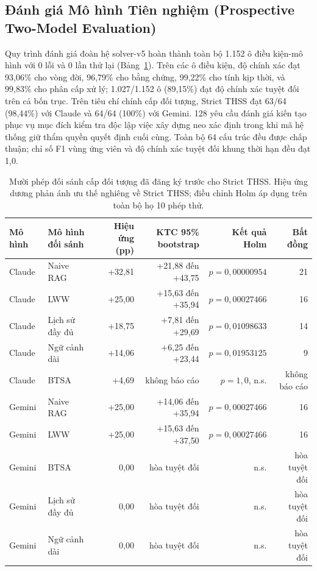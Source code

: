 \documentclass[11pt]{article}
\begin{document}
\subsection{Đánh giá Mô hình Tiên nghiệm (Prospective Two-Model Evaluation)}
Quy trình đánh giá đoàn hệ solver-v5 hoàn thành toàn bộ 1.152 ô điều kiện-mô hình với 0 lỗi và 0 lần thử lại (Bảng~\ref{tab:models_vi}). Trên các ô điều kiện, độ chính xác đạt 93{,}06\% cho vòng đời, 96{,}79\% cho bằng chứng, 99{,}22\% cho tính kịp thời, và 99{,}83\% cho phân cấp xử lý; 1.027/1.152 ô (89{,}15\%) đạt độ chính xác tuyệt đối trên cả bốn trục. Trên tiêu chí chính cấp đối tượng, Strict THSS đạt 63/64 (98{,}44\%) với Claude và 64/64 (100\%) với Gemini. 128 yêu cầu đánh giá kiến tạo phục vụ mục đích kiểm tra độc lập việc xây dựng neo xác định trong khi mã hệ thống giữ thẩm quyền quyết định cuối cùng. Toàn bộ 64 cấu trúc đều được chấp thuận; chỉ số F1 vùng ứng viên và độ chính xác tuyệt đối khung thời hạn đều đạt 1{,}0.

\begin{table}[H]
\centering
\scriptsize
\caption{Mười phép đối sánh cấp đối tượng đã đăng ký trước cho Strict THSS. Hiệu ứng dương phản ánh ưu thế nghiêng về Strict THSS; điều chỉnh Holm áp dụng trên toàn bộ họ 10 phép thử.}
\label{tab:models_vi}
\begin{tabular}{llrrrr}
\toprule
\textbf{Mô hình} & \textbf{Mô hình đối sánh} & \textbf{Hiệu ứng (pp)} & \textbf{KTC 95\% bootstrap} & \textbf{Kết quả Holm} & \textbf{Bất đồng}\\
\midrule
Claude & Naive RAG & +32{,}81 & +21{,}88 đến +43{,}75 & $p=0{,}00000954$ & 21\\
Claude & LWW & +25{,}00 & +15{,}63 đến +35{,}94 & $p=0{,}00027466$ & 16\\
Claude & Lịch sử đầy đủ & +18{,}75 & +7{,}81 đến +29{,}69 & $p=0{,}01098633$ & 14\\
Claude & Ngữ cảnh dài & +14{,}06 & +6{,}25 đến +23{,}44 & $p=0{,}01953125$ & 9\\
Claude & BTSA & +4{,}69 & không báo cáo & $p=1{,}0$, n.s. & không báo cáo\\
Gemini & Naive RAG & +25{,}00 & +14{,}06 đến +35{,}94 & $p=0{,}00027466$ & 16\\
Gemini & LWW & +25{,}00 & +15{,}63 đến +37{,}50 & $p=0{,}00027466$ & 16\\
Gemini & BTSA & 0{,}00 & hòa tuyệt đối & n.s. & hòa tuyệt đối\\
Gemini & Lịch sử đầy đủ & 0{,}00 & hòa tuyệt đối & n.s. & hòa tuyệt đối\\
Gemini & Ngữ cảnh dài & 0{,}00 & hòa tuyệt đối & n.s. & hòa tuyệt đối\\
\bottomrule
\end{tabular}
\end{table}
\end{document}
